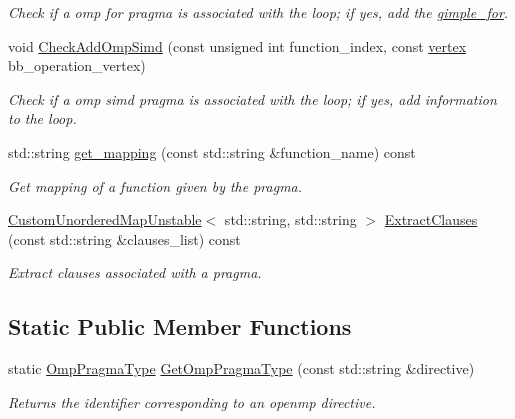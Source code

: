 \begin{DoxyCompactItemize}
\begin{DoxyCompactList}\small\item\em Check if a omp for pragma is associated with the loop; if yes, add the \hyperlink{structgimple__for}{gimple\+\_\+for}. \end{DoxyCompactList}\item 
void \hyperlink{classpragma__manager_ad95c048bc928e1a762807c74796a1fdc}{Check\+Add\+Omp\+Simd} (const unsigned int function\+\_\+index, const \hyperlink{graph_8hpp_abefdcf0544e601805af44eca032cca14}{vertex} bb\+\_\+operation\+\_\+vertex)
\begin{DoxyCompactList}\small\item\em Check if a omp simd pragma is associated with the loop; if yes, add information to the loop. \end{DoxyCompactList}\item 
std\+::string \hyperlink{classpragma__manager_a21204318c4555fe290a13ba900ee661f}{get\+\_\+mapping} (const std\+::string \&function\+\_\+name) const
\begin{DoxyCompactList}\small\item\em Get mapping of a function given by the pragma. \end{DoxyCompactList}\item 
\hyperlink{custom__map_8hpp_a8cbaceffc09790a885ec7e9c17809c69}{Custom\+Unordered\+Map\+Unstable}$<$ std\+::string, std\+::string $>$ \hyperlink{classpragma__manager_a5e065372e3faa9eac004888ad14c95f4}{Extract\+Clauses} (const std\+::string \&clauses\+\_\+list) const
\begin{DoxyCompactList}\small\item\em Extract clauses associated with a pragma. \end{DoxyCompactList}\end{DoxyCompactItemize}
\subsection*{Static Public Member Functions}
\begin{DoxyCompactItemize}
\item 
static \hyperlink{classpragma__manager_a181a86a91d4331ed5c884f9cec850238}{Omp\+Pragma\+Type} \hyperlink{classpragma__manager_a7810d8d6ef6bc3ee34d67f209cd277cf}{Get\+Omp\+Pragma\+Type} (const std\+::string \&directive)
\begin{DoxyCompactList}\small\item\em Returns the identifier corresponding to an openmp directive. \end{DoxyCompactList}\end{DoxyCompactItemize}
